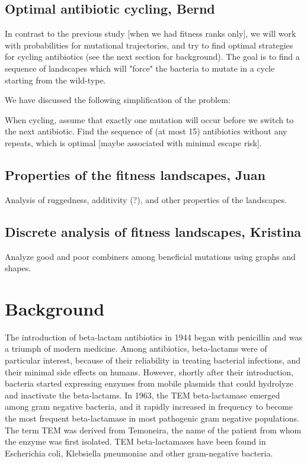 \documentclass[12pt]{amsart}
\theoremstyle{plain}
\theoremstyle{definition}
\begin{document}
\subsection{Optimal antibiotic cycling, Bernd}
In contrast to the previous study [when we had
fitness ranks only], 
we will work with probabilities for
mutational trajectories, and 
try to find optimal strategies for 
cycling antibiotics (see the next section 
for background).
The goal is to find a  sequence of landscapes
which will "force" the bacteria to mutate in a cycle
starting from the wild-type. 

We have discussed the following simplification of the problem:
 
When cycling, assume that exactly one mutation will occur before we
switch to the next antibiotic.
Find the sequence of (at most 15) antibiotics without any repeats,
which is optimal [maybe associated with minimal
escape risk].

\subsection{Properties of the fitness landscapes, Juan}
Analysis of ruggedness, additivity (?), 
and other properties of the landscapes.

\subsection{Discrete analysis of fitness landscapes, Kristina}
Analyze good and poor combiners among beneficial 
mutations using graphs and shapes.

\section{Background}
The introduction of beta-lactam antibiotics in 1944 began with penicillin and was a triumph of modern medicine.   Among antibiotics,   beta-lactams were of particular interest, because of their reliability in treating bacterial infections, and their minimal side effects on humans.  However, shortly after their introduction, bacteria started expressing enzymes from mobile plasmids that could hydrolyze and inactivate the beta-lactams. In 1963, the TEM beta-lactamase emerged among gram negative bacteria, and it rapidly increased in frequency to become the most frequent beta-lactamase in most pathogenic gram negative populations.   The term TEM was derived from Temoneira, the name of the patient from whom the enzyme was first isolated. TEM beta-lactamases have been found in Escherichia coli, Klebsiella pneumoniae and other gram-negative bacteria. 
\end{document}
